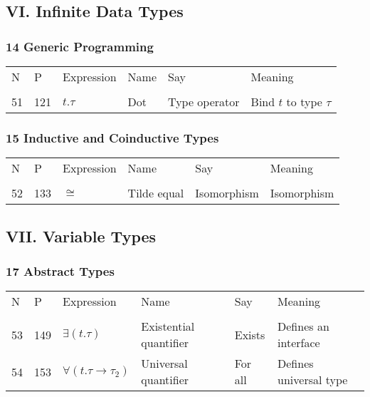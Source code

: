 \documentclass[12pt]{article}
\begin{document}
\subsection*{VI. Infinite Data Types}
\subsubsection*{14 Generic Programming}
\begin{tabular}[b] {p{} p{} p{} p{} 
p{} p{}}
N & P & Expression & Name & Say & Meaning \\ \\

51& 121 & $t.\tau$ & Dot & Type operator & Bind $t$ to type $\tau$ \\
\end{tabular}
\subsubsection*{15 Inductive and Coinductive Types}
\begin{tabular}[b] {p{} p{} p{} p{} 
p{} p{}}
N & P & Expression & Name & Say & Meaning \\ \\

52& 133 & $ \cong $ & Tilde equal & Isomorphism & Isomorphism \\
\end{tabular}
\subsection*{VII. Variable Types}
\subsubsection*{17 Abstract Types}
\begin{tabular}[b] {p{} p{} p{} p{} 
p{} p{}}
N & P & Expression & Name & Say & Meaning \\ \\
53 & 149 & $\exists(t.\tau)$ & Existential quantifier & Exists & Defines an interface \\
54 & 153 & $\forall(t.\tau\longrightarrow\tau_2)$ & Universal quantifier & For all & Defines universal type \\
\end{tabular}
\end{document}
